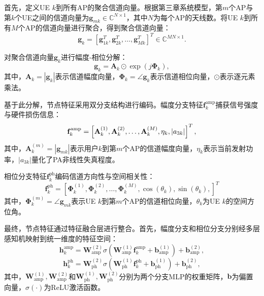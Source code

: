首先，定义UE $k$到所有AP的聚合信道向量。根据第三章系统模型，第$m$个AP与第$k$个UE之间的信道向量为$\mathbf{g}_{mk} \in \mathbb{C}^{N \times 1}$，其中$N$为每个AP的天线数。将UE $k$到所有$M$个AP的信道向量进行聚合，得到聚合信道向量：
\begin{equation}
\mathbf{g}_{k} = \left[\mathbf{g}_{1k}^{T}, \mathbf{g}_{2k}^{T}, \ldots, \mathbf{g}_{Mk}^{T}\right]^{T} \in \mathbb{C}^{MN \times 1}.
\end{equation}

对聚合信道向量$\mathbf{g}_{k}$进行幅度-相位分解：
\begin{equation}
\mathbf{g}_{k} = \mathbf{A}_{k} \odot \exp(j\boldsymbol{\Phi}_{k}),
\end{equation}
其中，$\mathbf{A}_{k} = |\mathbf{g}_{k}|$表示信道幅度向量，$\boldsymbol{\Phi}_{k} = \angle\mathbf{g}_{k}$表示信道相位向量，$\odot$表示逐元素乘法。

基于此分解，节点特征采用双分支结构进行编码。幅度分支特征$\mathbf{f}_{k}^{\text{amp}}$捕获信号强度与硬件损伤信息：
\begin{equation}
\mathbf{f}_{k}^{\textnormal{amp}}=\left[\mathbf{A}_{k}^{(1)}, \mathbf{A}_{k}^{(2)}, \ldots, \mathbf{A}_{k}^{(M)}, \eta_{k},\left|a_{3 k}\right|\right]^{T},
\end{equation}
其中，$\mathbf{A}_{k}^{(m)} = |\mathbf{g}_{mk}|$表示用户$k$到第$m$个AP的信道幅度向量，$\eta_{k}$表示当前发射功率，$\left|a_{3 k}\right|$量化了PA非线性失真程度。

相位分支特征$\mathbf{f}_{k}^{\text{ph}}$编码信道方向性与空间相关性：
\begin{equation}
\mathbf{f}_{k}^{\text{ph}}=\left[\boldsymbol{\Phi}_{k}^{(1)}, \boldsymbol{\Phi}_{k}^{(2)}, \ldots, \boldsymbol{\Phi}_{k}^{(M)}, \cos(\theta_{k}), \sin(\theta_{k}), \right]^{T}
\end{equation}
其中，$\boldsymbol{\Phi}_{k}^{(m)} = \angle\mathbf{g}_{mk}$表示UE $k$到第$m$个AP的信道相位向量，$\theta_{k}$为UE $k$的空间方位角。

最终，节点特征通过特征融合层进行整合。首先，幅度分支和相位分支分别经多层感知机映射到统一维度的特征空间：
\begin{equation}
\mathbf{h}_{k}^{\text{amp}} = \mathbf{W}_{\text{amp}}^{(2)} \sigma\left(\mathbf{W}_{\text{amp}}^{(1)} \mathbf{f}_{k}^{\text{amp}} + \mathbf{b}_{\text{amp}}^{(1)}\right) + \mathbf{b}_{\text{amp}}^{(2)},
\end{equation}
\begin{equation}
\mathbf{h}_{k}^{\text{ph}} = \mathbf{W}_{\text{ph}}^{(2)} \sigma\left(\mathbf{W}_{\text{ph}}^{(1)} \mathbf{f}_{k}^{\text{ph}} + \mathbf{b}_{\text{ph}}^{(1)}\right) + \mathbf{b}_{\text{ph}}^{(2)},
\end{equation}
其中，$\mathbf{W}_{\text{amp}}^{(1)}, \mathbf{W}_{\text{amp}}^{(2)}$和$\mathbf{W}_{\text{ph}}^{(1)}, \mathbf{W}_{\text{ph}}^{(2)}$分别为两个分支MLP的权重矩阵，$\mathbf{b}$为偏置向量，$\sigma(\cdot)$为ReLU激活函数。

